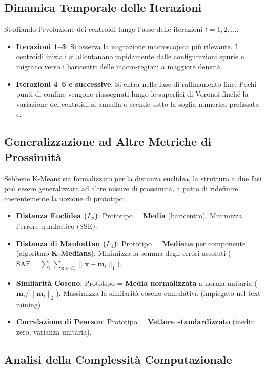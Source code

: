 \subsection{Dinamica Temporale delle Iterazioni}

Studiando l'evoluzione dei centroidi lungo l'asse delle iterazioni $t = 1, 2, \dots$:
\begin{itemize}[noitemsep]
    \item \textbf{Iterazioni 1--3}: Si osserva la migrazione macroscopica più rilevante. I centroidi iniziali si allontanano rapidamente dalle configurazioni spurie e migrano verso i baricentri delle macro-regioni a maggiore densità.
    \item \textbf{Iterazioni 4--6 e successive}: Si entra nella fase di raffinamento fine. Pochi punti di confine vengono riassegnati lungo le superfici di Voronoi finché la variazione dei centroidi si annulla o scende sotto la soglia numerica prefissata $\epsilon$.
\end{itemize}

\subsection{Generalizzazione ad Altre Metriche di Prossimità}

Sebbene K-Means sia formalizzato per la distanza euclidea, la struttura a due fasi può essere generalizzata ad altre misure di prossimità, a patto di ridefinire coerentemente la nozione di prototipo:
\begin{itemize}
    \item \textbf{Distanza Euclidea ($L_2$)}: Prototipo = \textbf{Media} (baricentro). Minimizza l'errore quadratico ($\mathrm{SSE}$).
    \item \textbf{Distanza di Manhattan ($L_1$)}: Prototipo = \textbf{Mediana} per componente (algoritmo \textbf{K-Medians}). Minimizza la somma degli errori assoluti ($\mathrm{SAE} = \sum_{i} \sum_{\mathbf{x} \in C_i} \|\mathbf{x} - \mathbf{m}_i\|_1$).
    \item \textbf{Similarità Coseno}: Prototipo = \textbf{Media normalizzata} a norma unitaria ($\mathbf{m}_i / \|\mathbf{m}_i\|_2$). Massimizza la similarità coseno cumulativa (impiegato nel text mining).
    \item \textbf{Correlazione di Pearson}: Prototipo = \textbf{Vettore standardizzato} (media zero, varianza unitaria).
\end{itemize}

\subsection{Analisi della Complessità Computazionale}

